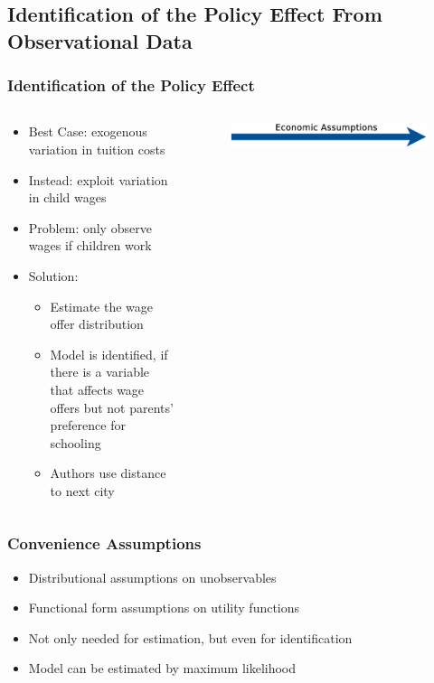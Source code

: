 \documentclass[11pt]{beamer}
\begin{document}
\subsection{Identification of the Policy Effect From Observational Data}


\begin{frame}[c]\frametitle{Identification of the Policy Effect}
\begin{columns}
\begin{column}{.95\textwidth}
\begin{itemize}

    \item \alert{Best Case}: exogenous variation in tuition costs

    \item \alert{Instead}: exploit variation in child wages

    \item \alert{Problem}: only observe wages if children work

    \item \alert{Solution}:
    \begin{itemize}
         \item Estimate the wage offer distribution
        \item Model is identified, if there is a variable that affects wage offers but not parents' preference for schooling
        \item Authors use distance to next city
     \end{itemize}
\end{itemize}
\end{column}
\begin{column}{0.05\textwidth}
\begin{figure}
    \includegraphics[angle=270,origin=c,height=0.37\textheight]{graphs/Diagram1.eps}
\end{figure}
\end{column}
\end{columns}
\end{frame}


\begin{frame}[c]\frametitle{Convenience Assumptions}
\begin{itemize}
    \item Distributional assumptions on unobservables
    \item Functional form assumptions on utility functions
    \item Not only needed for estimation, but even for identification
    \item Model can be estimated by maximum likelihood
\end{itemize}
\end{frame}
\end{document}
